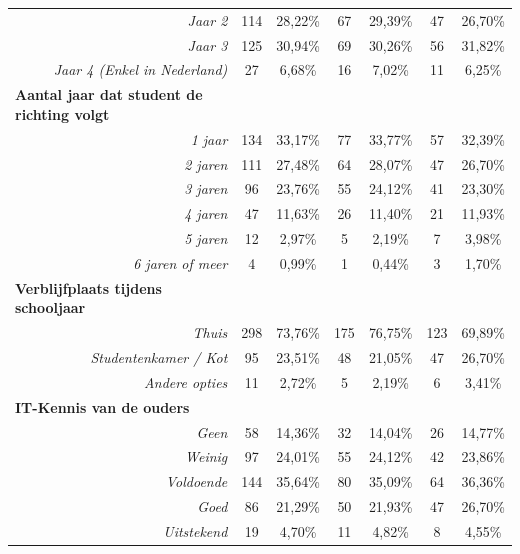 \begin{landscape}
\begin{longtable}[c]{r|cccccc|}
		\multicolumn{1}{|r|}{\textit{Jaar 2}} & 114 & 28,22\% & 67 & 29,39\% & 47 & 26,70\% \\
		\multicolumn{1}{|r|}{\textit{Jaar 3}} & 125 & 30,94\% & 69 & 30,26\% & 56 & 31,82\% \\
		\multicolumn{1}{|r|}{\textit{Jaar 4 (Enkel in Nederland)}} & 27 & 6,68\% & 16 & 7,02\% & 11 & 6,25\% \\ \hline
		\multicolumn{1}{|l|}{\textbf{Aantal jaar dat student de richting volgt}} &  &  &  &  &  &  \\
		\multicolumn{1}{|r|}{\textit{1 jaar}} & 134 & 33,17\% & 77 & 33,77\% & 57 & 32,39\% \\
		\multicolumn{1}{|r|}{\textit{2 jaren}} & 111 & 27,48\% & 64 & 28,07\% & 47 & 26,70\% \\
		\multicolumn{1}{|r|}{\textit{3 jaren}} & 96 & 23,76\% & 55 & 24,12\% & 41 & 23,30\% \\
		\multicolumn{1}{|r|}{\textit{4 jaren}} & 47 & 11,63\% & 26 & 11,40\% & 21 & 11,93\% \\
		\multicolumn{1}{|r|}{\textit{5 jaren}} & 12 & 2,97\% & 5 & 2,19\% & 7 & 3,98\% \\
		\multicolumn{1}{|r|}{\textit{6 jaren of meer}} & 4 & 0,99\% & 1 & 0,44\% & 3 & 1,70\% \\ \hline
		\multicolumn{1}{|l|}{\textbf{Verblijfplaats tijdens schooljaar}} &  &  &  &  &  &  \\
		\multicolumn{1}{|r|}{\textit{Thuis}} & 298 & 73,76\% & 175 & 76,75\% & 123 & 69,89\% \\
		\multicolumn{1}{|r|}{\textit{Studentenkamer / Kot}} & 95 & 23,51\% & 48 & 21,05\% & 47 & 26,70\% \\
		\multicolumn{1}{|r|}{\textit{Andere opties}} & 11 & 2,72\% & 5 & 2,19\% & 6 & 3,41\% \\ \hline
		\multicolumn{1}{|l|}{\textbf{IT-Kennis van de ouders}} &  &  &  &  &  &  \\
		\multicolumn{1}{|r|}{\textit{Geen}} & 58 & 14,36\% & 32 & 14,04\% & 26 & 14,77\% \\
		\multicolumn{1}{|r|}{\textit{Weinig}} & 97 & 24,01\% & 55 & 24,12\% & 42 & 23,86\% \\
		\multicolumn{1}{|r|}{\textit{Voldoende}} & 144 & 35,64\% & 80 & 35,09\% & 64 & 36,36\% \\
		\multicolumn{1}{|r|}{\textit{Goed}} & 86 & 21,29\% & 50 & 21,93\% & 47 & 26,70\% \\
		\multicolumn{1}{|r|}{\textit{Uitstekend}} & 19 & 4,70\% & 11 & 4,82\% & 8 & 4,55\% \\ \hline

\end{longtable}
\end{landscape}
